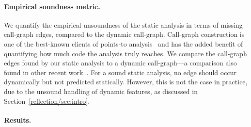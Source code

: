 


\paragraph{Empirical soundness metric.}
We quantify the empirical unsoundness of the static analysis in terms
of missing call-graph edges, compared to the dynamic
call-graph. Call-graph construction is one of the best-known clients
of points-to analysis~\cite{ecoop/AliL12,ecoop/AliL13,ecoop/LiTSX14}
and has the added benefit of quantifying how much code the analysis
truly reaches. We compare the call-graph edges found by our static
analysis to a dynamic call-graph---a comparison also found in other
recent work~\cite{pppj/StancuWBLF14}. For a sound static analysis, no
edge should occur dynamically but not predicted statically. However,
this is not the case in practice, due to the unsound handling of
dynamic features, as discussed in Section~\ref{reflection/sec:intro}.

\paragraph{Results.}


